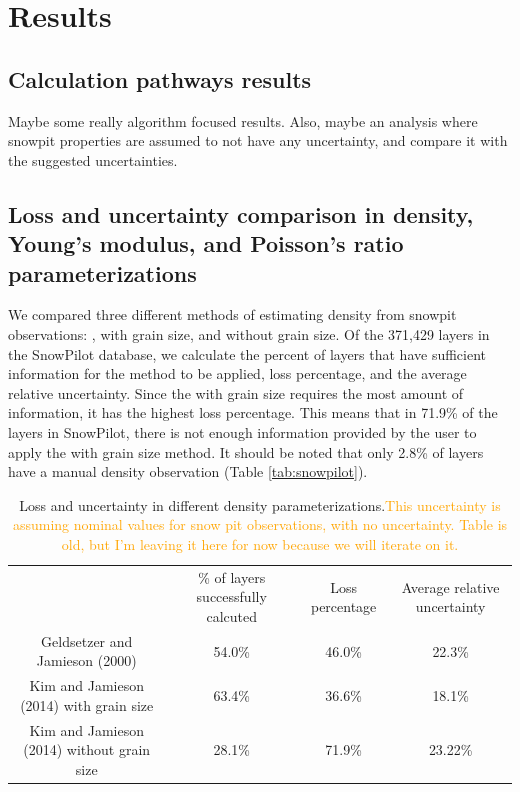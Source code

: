 \documentclass[journal abbreviation, manuscript]{copernicus}
\begin{document}
\section{Results}

\subsection{Calculation pathways results}
\textcolor{RubineRed}{Maybe some really algorithm focused results. Also, maybe an analysis where snowpit properties are assumed to not have any uncertainty, and compare it with the suggested uncertainties.}

\subsection{Loss and uncertainty comparison in density, Young's modulus, and Poisson's ratio parameterizations}
We compared three different methods of estimating density from snowpit observations: \citet{geldsetzer2000}, \citet{kim2014} with grain size, and \citet{kim2014} without grain size. Of the 371,429 layers in the SnowPilot database, we calculate the percent of layers that have sufficient information for the method to be applied, loss percentage, and the average relative uncertainty. Since the \citet{kim2014} with grain size requires the most amount of information, it has the highest loss percentage. This means that in 71.9\% of the layers in SnowPilot, there is not enough information provided by the user to apply the \citet{kim2014} with grain size method. It should be noted that only 2.8\% of layers have a manual density observation  (Table \ref{tab:snowpilot}).



\begin{table}\label{tab:dens_comp}
    \caption{Loss and uncertainty in different density parameterizations.\textcolor{Orange}{This uncertainty is assuming nominal values for snow pit observations, with no uncertainty. \textcolor{RubineRed}{Table is old, but I'm leaving it here for now because we will iterate on it.}}}
    \centering
    \begin{tabular}{cccc}
         &  \% of layers successfully calcuted&  Loss percentage& Average relative uncertainty\\
         Geldsetzer and Jamieson (2000)&  54.0\%&  46.0\%& 22.3\%\\
         Kim and Jamieson (2014) with grain size&  63.4\%&  36.6\%& 18.1\%\\
         Kim and Jamieson (2014) without grain size&  28.1\%&  71.9\%& 23.22\%\\
    \end{tabular}

\end{table}
\end{document}
